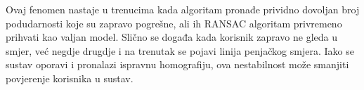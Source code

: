 Ovaj fenomen nastaje u trenucima kada algoritam pronađe prividno dovoljan broj podudarnosti koje su zapravo pogrešne, ali ih RANSAC algoritam privremeno prihvati kao valjan model. Slično se događa kada korisnik zapravo ne gleda u smjer, već negdje drugdje i na trenutak se pojavi linija penjačkog smjera. Iako se sustav oporavi i pronalazi ispravnu homografiju, ova nestabilnost može smanjiti povjerenje korisnika u sustav. 

